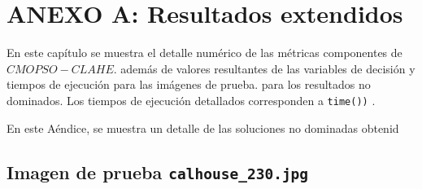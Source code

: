 \renewcommand\thesection{A.\arabic{figure}}
\renewcommand\thefigure{\thesection.\arabic{figure}}
\renewcommand{\thetable}{A.\arabic{table}} 

\chapter*{ANEXO A: Resultados extendidos}
\label{ch:anexo}
\setcounter{figure}{0}
\setcounter{table}{0} 
En este capítulo se muestra el detalle numérico de las métricas componentes de $CMOPSO-CLAHE$. además de valores resultantes de las variables de decisión y tiempos de ejecución para las imágenes de prueba. para los resultados no dominados. Los tiempos de ejecución detallados corresponden a \texttt{time())} \cite{time}.

En este Aéndice, se muestra un detalle de las soluciones no dominadas obtenid


\section{Imagen de prueba \texttt{calhouse\_230.jpg}}

